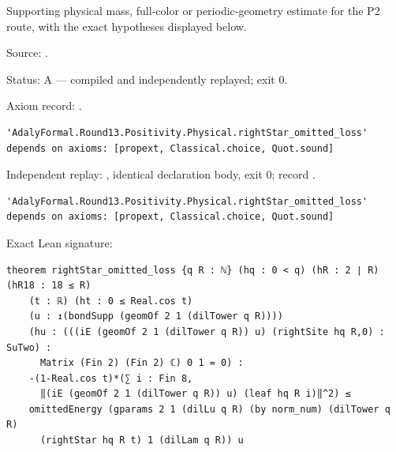\begin{theorem}[bp-492]
\label{bp-492}
\leanok
Supporting physical mass, full-color or periodic-geometry estimate for the P2 route, with the exact hypotheses displayed below.

\par Source: \texttt{}.
\par Status: A — compiled and independently replayed; exit 0.
\par Axiom record: \texttt{}.
\begin{verbatim}
'AdalyFormal.Round13.Positivity.Physical.rightStar_omitted_loss' depends on axioms: [propext, Classical.choice, Quot.sound]
\end{verbatim}
\par Independent replay: \texttt{}, identical declaration body, exit 0; record \texttt{}.
\begin{verbatim}
'AdalyFormal.Round13.Positivity.Physical.rightStar_omitted_loss' depends on axioms: [propext, Classical.choice, Quot.sound]
\end{verbatim}
\par Exact Lean signature:
\begin{verbatim}
theorem rightStar_omitted_loss {q R : ℕ} (hq : 0 < q) (hR : 2 ∣ R) (hR18 : 18 ≤ R)
    (t : ℝ) (ht : 0 ≤ Real.cos t)
    (u : ↥(bondSupp (geomOf 2 1 (dilTower q R))))
    (hu : (((iE (geomOf 2 1 (dilTower q R)) u) (rightSite hq R,0) : SuTwo) :
      Matrix (Fin 2) (Fin 2) ℂ) 0 1 = 0) :
    -(1-Real.cos t)*(∑ i : Fin 8,
      ‖(iE (geomOf 2 1 (dilTower q R)) u) (leaf hq R i)‖^2) ≤
    omittedEnergy (gparams 2 1 (dilLu q R) (by norm_num) (dilTower q R)
      (rightStar hq R t) 1 (dilLam q R)) u
\end{verbatim}
\end{theorem}

